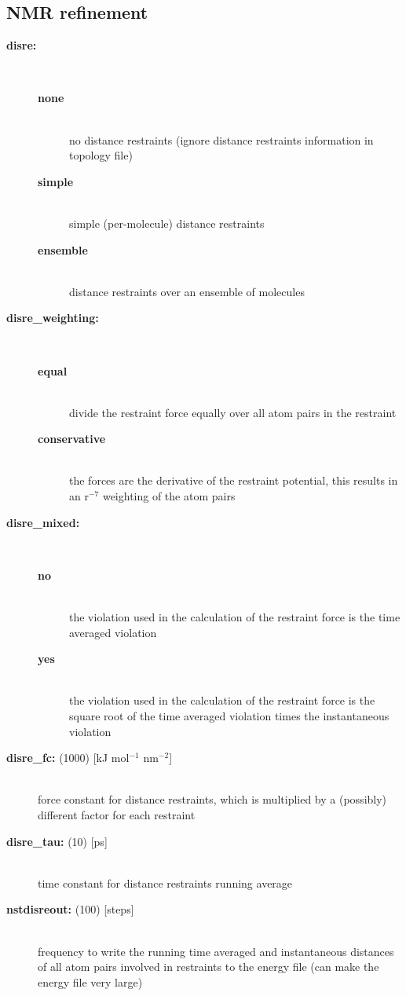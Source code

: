 \subsection{NMR refinement}
\begin{description}
\item[{\bf disre:}]\mbox{}\\
\vspace{-2ex}\begin{description}
\item[{\bf none}]\mbox{}\\
no distance restraints (ignore distance restraints information in
topology file)
\item[{\bf simple}]\mbox{}\\
simple (per-molecule) distance restraints
\item[{\bf ensemble}]\mbox{}\\
distance restraints over an ensemble of molecules
\end{description}
\item[{\bf disre\_weighting:}]\mbox{}\\
\vspace{-2ex}\begin{description}
\item[{\bf equal}]\mbox{}\\
divide the restraint force equally over all atom pairs in the restraint
\item[{\bf conservative}]\mbox{}\\
the forces are the derivative of the restraint potential,
this results in an r$^{-7}$ weighting of the atom pairs
\end{description}
\item[{\bf disre\_mixed:}]\mbox{}\\
\vspace{-2ex}\begin{description}
\item[{\bf no}]\mbox{}\\
the violation used in the calculation of the restraint force is the
time averaged violation 
\item[{\bf yes}]\mbox{}\\
the violation used in the calculation of the restraint force is the
square root of the time averaged violation times the instantaneous violation 
\end{description}
\item[{\bf disre\_fc: }(1000) {[kJ mol$^{-1}$ nm$^{-2}$]}]\mbox{}\\
force constant for distance restraints, which is multiplied by a
(possibly) different factor for each restraint
\item[{\bf disre\_tau: }(10) {[ps]}]\mbox{}\\
time constant for distance restraints running average
\item[{\bf nstdisreout: }(100) {[steps]}]\mbox{}\\
frequency to write the running time averaged and instantaneous distances
of all atom pairs involved in restraints to the energy file
(can make the energy file very large)
\end{description}

